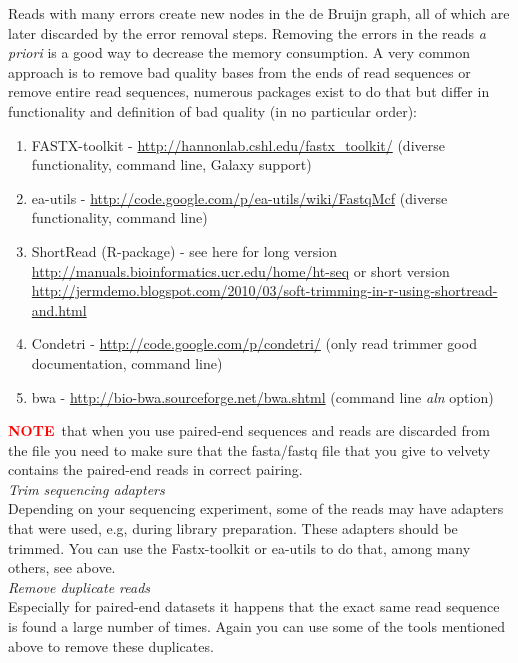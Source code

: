 \documentclass[12pt]{article}
\newcommand{\NOTE}{\textcolor{red}{\textbf{NOTE}}}
\begin{document}
Reads with many errors create new nodes in the de Bruijn graph, all of which are later discarded by the error removal steps. Removing the errors in the reads \emph{a priori} is a good way to decrease the memory consumption.  A very common approach is to remove bad quality bases from the ends of read sequences or remove entire read sequences, numerous packages exist to do that but differ in functionality and definition of bad quality  (in no particular order):
\begin{enumerate}
\item  FASTX-toolkit - \url{http://hannonlab.cshl.edu/fastx_toolkit/}  (diverse functionality, command line, Galaxy support)
\item ea-utils - \url{http://code.google.com/p/ea-utils/wiki/FastqMcf} (diverse functionality, command line)
\item ShortRead (R-package) -  see here for long version \url{http://manuals.bioinformatics.ucr.edu/home/ht-seq} or short version \url{http://jermdemo.blogspot.com/2010/03/soft-trimming-in-r-using-shortread-and.html}
\item Condetri - \url{http://code.google.com/p/condetri/} (only read trimmer good documentation, command line)
\item bwa - \url{http://bio-bwa.sourceforge.net/bwa.shtml} (command line \emph{aln} option)
\end{enumerate}

\NOTE \  that when you use paired-end sequences and reads are discarded from the file you need to make sure that the fasta/fastq file that you give to velvety contains the paired-end reads in correct pairing.\\

\emph{Trim sequencing adapters} \\

Depending on your sequencing experiment, some of the reads may have adapters that were used, e.g, during library preparation. These adapters should be trimmed. You can use the Fastx-toolkit or ea-utils to do that, among many others, see above.\\

\emph{Remove duplicate reads} \\

Especially for paired-end datasets it happens that the exact same read sequence is found a large number of times. Again you can use some of the tools mentioned above to remove these duplicates.
\end{document}
